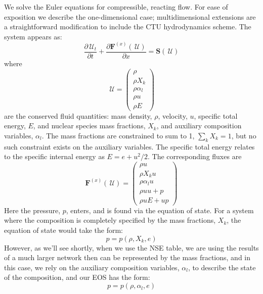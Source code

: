 \documentclass[times,modern]{aastex63}
\newcommand{\Uc}{{\,\bm{\mathcal{U}}}}
\newcommand{\Fb}{\mathbf{F}}
\newcommand{\Sc}{\mathbf{S}}
\newcommand{\xv}{{(x)}}
\begin{document}
We solve the Euler equations for compressible, reacting flow.  For ease
of exposition we describe the one-dimensional case;
multidimensional extensions are a straightforward modification to
include the CTU hydrodynamics scheme.
The system appears as:
\begin{equation}
\frac{\partial \Uc_t}{\partial t}  + \frac{\partial \Fb^\xv (\Uc)}{\partial x} = \Sc(\Uc)
\end{equation}
where
\begin{equation}
\Uc = \left ( \begin{array}{c}
           \rho \\
           \rho X_k \\
           \rho \alpha_l \\
           \rho u \\
           \rho E \end{array}\right )
\end{equation}
are the conserved fluid quantities: mass density, $\rho$, velocity,
$u$, specific total energy, $E$, and nuclear species mass fractions,
$X_k$, and auxiliary composition variables, $\alpha_l$.  The mass fractions
are constrained to sum to 1, $\sum_k X_k = 1$, but no such constraint
exists on the auxiliary variables.  The specific total energy relates
to the specific internal energy as $E = e + u^2/2$.  The corresponding
fluxes are
\begin{equation}
\Fb^\xv (\Uc) = \left ( \begin{array}{c}
   \rho u \\
   \rho X_k u \\
   \rho \alpha_l u \\
   \rho u u + p \\
   \rho u E + u p
   \end{array} \right )
\end{equation}
Here the pressure, $p$, enters, and is found via the equation of state.  For a system
where the composition is completely specified by the mass fractions, $X_k$, the equation
of state would take the form:
\begin{equation}
p = p(\rho, X_k, e)
\end{equation}
However, as we'll see shortly, when we use the NSE table, we are using
the results of a much larger network then can be represented by the
mass fractions, and in this case, we rely on the auxiliary composition
variables, $\alpha_l$, to describe the state of the composition, and
our EOS has the form:
\begin{equation}
p = p(\rho, \alpha_l, e)
\end{equation}
\end{document}
